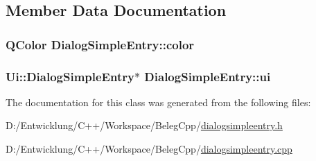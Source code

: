 \subsection{Member Data Documentation}
\hypertarget{class_dialog_simple_entry_a797fd737de17d712425cb61142a9789d}{
\subsubsection[{color}]{\setlength{\rightskip}{0pt plus 5cm}Q\+Color Dialog\+Simple\+Entry\+::color\hspace{0.3cm}{\ttfamily [private]}}}\label{class_dialog_simple_entry_a797fd737de17d712425cb61142a9789d}
\hypertarget{class_dialog_simple_entry_a3ef78d511f3bd60f104be4851b8e8e7b}{
\subsubsection[{ui}]{\setlength{\rightskip}{0pt plus 5cm}Ui\+::\+Dialog\+Simple\+Entry$\ast$ Dialog\+Simple\+Entry\+::ui\hspace{0.3cm}{\ttfamily [private]}}}\label{class_dialog_simple_entry_a3ef78d511f3bd60f104be4851b8e8e7b}


The documentation for this class was generated from the following files\+:\begin{DoxyCompactItemize}
\item 
D\+:/\+Entwicklung/\+C++/\+Workspace/\+Beleg\+Cpp/\hyperlink{dialogsimpleentry_8h}{dialogsimpleentry.\+h}\item 
D\+:/\+Entwicklung/\+C++/\+Workspace/\+Beleg\+Cpp/\hyperlink{dialogsimpleentry_8cpp}{dialogsimpleentry.\+cpp}\end{DoxyCompactItemize}
